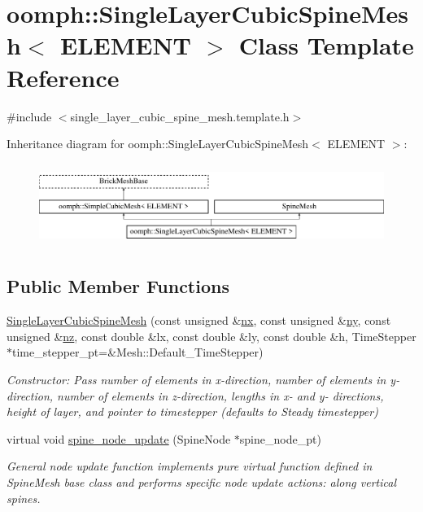 \hypertarget{classoomph_1_1SingleLayerCubicSpineMesh}{}\section{oomph\+:\+:Single\+Layer\+Cubic\+Spine\+Mesh$<$ E\+L\+E\+M\+E\+NT $>$ Class Template Reference}
\label{classoomph_1_1SingleLayerCubicSpineMesh}


{\ttfamily \#include $<$single\+\_\+layer\+\_\+cubic\+\_\+spine\+\_\+mesh.\+template.\+h$>$}

Inheritance diagram for oomph\+:\+:Single\+Layer\+Cubic\+Spine\+Mesh$<$ E\+L\+E\+M\+E\+NT $>$\+:\begin{figure}[H]
\begin{center}
\leavevmode
\includegraphics[height=2.718446cm]{classoomph_1_1SingleLayerCubicSpineMesh}
\end{center}
\end{figure}
\subsection*{Public Member Functions}
\begin{DoxyCompactItemize}
\item 
\hyperlink{classoomph_1_1SingleLayerCubicSpineMesh_a99a1c68b949c75b5afc9bb0eb93fec3e}{Single\+Layer\+Cubic\+Spine\+Mesh} (const unsigned \&\hyperlink{classoomph_1_1SimpleCubicMesh_ad29c917ec0adb29ad24e086e3dcd0b6f}{nx}, const unsigned \&\hyperlink{classoomph_1_1SimpleCubicMesh_a16979ec3b0e88fb37730415190021c1c}{ny}, const unsigned \&\hyperlink{classoomph_1_1SimpleCubicMesh_ad78725440e4e87598fd9339653b28e61}{nz}, const double \&lx, const double \&ly, const double \&h, Time\+Stepper $\ast$time\+\_\+stepper\+\_\+pt=\&Mesh\+::\+Default\+\_\+\+Time\+Stepper)
\begin{DoxyCompactList}\small\item\em Constructor\+: Pass number of elements in x-\/direction, number of elements in y-\/direction, number of elements in z-\/direction, lengths in x-\/ and y-\/ directions, height of layer, and pointer to timestepper (defaults to Steady timestepper) \end{DoxyCompactList}\item 
virtual void \hyperlink{classoomph_1_1SingleLayerCubicSpineMesh_a4851fbaed5be21441ad4f7b7f2a660e0}{spine\+\_\+node\+\_\+update} (Spine\+Node $\ast$spine\+\_\+node\+\_\+pt)
\begin{DoxyCompactList}\small\item\em General node update function implements pure virtual function defined in Spine\+Mesh base class and performs specific node update actions\+: along vertical spines. \end{DoxyCompactList}\end{DoxyCompactItemize}
